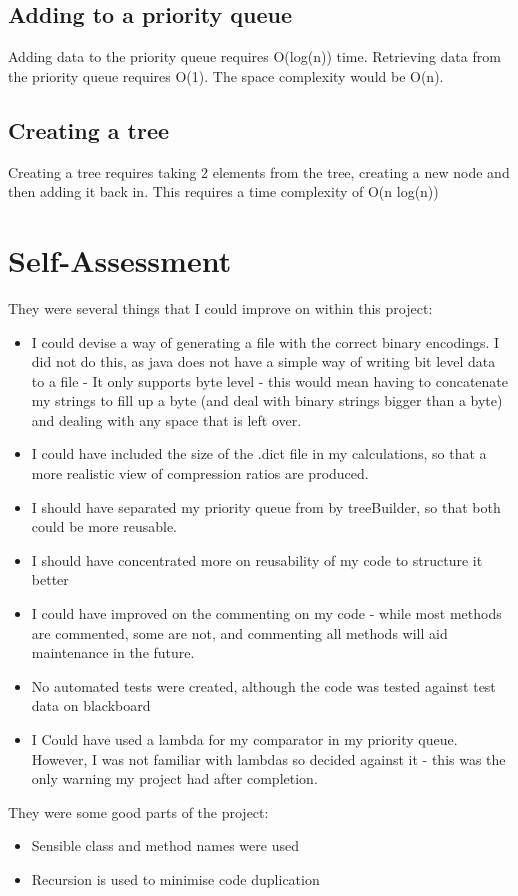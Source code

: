 \documentclass[11pt, oneside]{amsart}
\begin{document}
\subsection{Adding to a priority queue}
Adding data to the priority queue requires O(log(n)) time. Retrieving data from the priority queue requires O(1). The space complexity would be O(n).
\subsection{Creating a tree}
Creating a tree requires taking 2 elements from the tree, creating a new node and then adding it back in. This requires a time complexity of O(n log(n))
\section{Self-Assessment}
They were several things that I could improve on within this project:
\begin{itemize}
	\item I could devise a way of generating a file with the correct binary encodings. I did not do this, as java does not have a simple way of writing bit level data to a file - It only supports byte level - this would mean having to concatenate my strings to fill up a byte (and deal with binary strings bigger than a byte) and dealing with any space that is left over.
	\item I could have included the size of the .dict file in my calculations, so that a more realistic view of compression ratios are produced.
	\item I should have separated my priority queue from by treeBuilder, so that both could be more reusable.
	\item I should have concentrated more on reusability of my code to structure it better
	\item I could have improved on the commenting on my code - while most methods are commented, some are not, and commenting all methods will aid maintenance in the future.
	\item No automated tests were created, although the code was tested against test data on blackboard 
	\item I Could have used a lambda for my comparator in my priority queue. However, I was not familiar with lambdas so decided against it - this was the only warning my project had after completion.
\end{itemize} 
They were some good parts of the project:
\begin{itemize}
	\item Sensible class and method names were used
	\item Recursion is used to minimise code duplication
\end{itemize}
\end{document}
